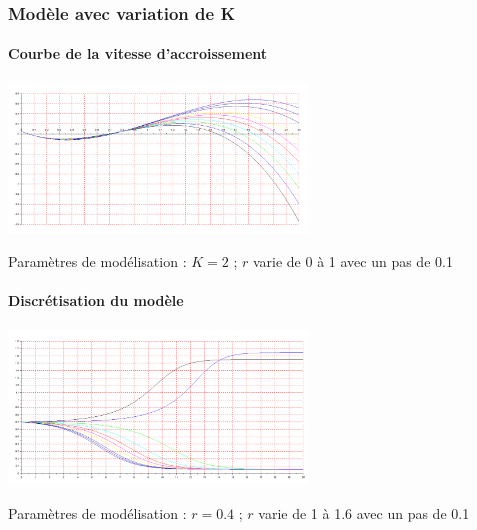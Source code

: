 \documentclass{article}
\begin{document}
\paragraph{}

\subsubsection{Modèle avec variation de K}

\paragraph{Courbe de la vitesse d'accroissement}
\begin{center}
\includegraphics[width=300px]{img/part1/AlleeK.png}
\end{center}
Paramètres de modélisation : $K=2$  ; $r$ varie de 0 à 1 avec un pas de 0.1
\paragraph{}

\paragraph{Discrétisation du modèle}
\begin{center}
\includegraphics[width=300px]{img/part1/TrajK.png}
\end{center}
Paramètres de modélisation : $r=0.4$  ; $r$ varie de 1 à 1.6 avec un pas de 0.1
\paragraph{}
\end{document}
